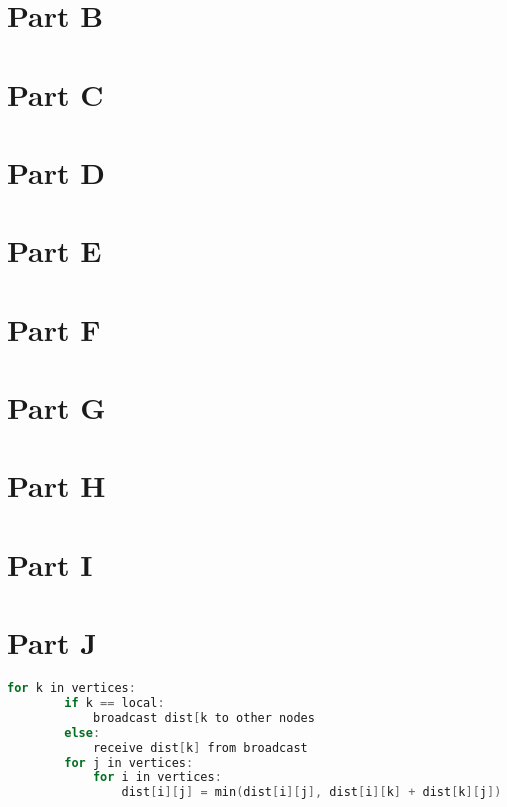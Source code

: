 \documentclass[12pt]{article}
\begin{document}
\section{Part B}

\section{Part C}

\section{Part D}

\section{Part E}

\section{Part F}

\section{Part G}

\section{Part H}

\section{Part I}

\section{Part J}

\begin{lstlisting}[language=c, caption=Distributed example]
    for k in vertices:
        if k == local:
            broadcast dist[k to other nodes
        else:
            receive dist[k] from broadcast
        for j in vertices:
            for i in vertices:
                dist[i][j] = min(dist[i][j], dist[i][k] + dist[k][j])
\end{lstlisting}

 
 

 
\end{document}
